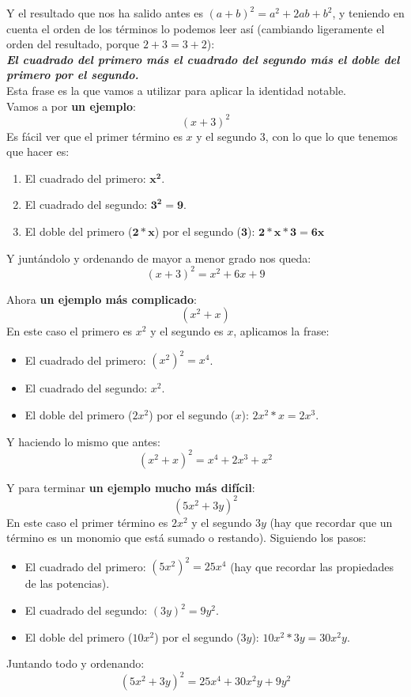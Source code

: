 \documentclass[a4paper,11pt,answers]{exam}
\begin{document}
  Y el resultado que nos ha salido antes es $(a+b)^2 = a^2 + 2ab + b^2$, y teniendo en cuenta el orden de los términos lo podemos leer así (cambiando ligeramente el orden del resultado, porque $2+3 = 3 +2$):\\
  \textbf{\emph{El cuadrado del primero más el cuadrado del segundo más el doble del primero por el segundo.}}\\
  Esta frase es la que vamos a utilizar para aplicar la identidad notable.\\

  Vamos a por \textbf{un ejemplo}:
  \[(x + 3)^2\]
  Es fácil ver que el primer término es $x$ y el segundo $3$, con lo que lo que tenemos que hacer es:
  \begin{enumerate}
  \item El cuadrado del primero: $\boldsymbol{x^2}$.
  \item El cuadrado del segundo: $\boldsymbol{3^2 = 9}$.
  \item El doble del primero ($\boldsymbol{2*x}$) por el segundo ($\boldsymbol{3}$): $\boldsymbol{2*x*3 = 6x}$
  \end{enumerate}
  Y juntándolo y ordenando de mayor a menor grado nos queda:
  \[(x+3)^2 = x^2 + 6x + 9\]

  Ahora \textbf{un ejemplo más complicado}:
  \[(x^2 + x)\]
  En este caso el primero es $x^2$ y el segundo es $x$, aplicamos la frase:
  \begin{itemize}
  \item El cuadrado del primero: $\left(x^2\right)^2 = x^4$.
  \item El cuadrado del segundo: $x^2$.
  \item El doble del primero ($2x^2$) por el segundo ($x$): $2x^2*x = 2x^3$.
  \end{itemize}
  Y haciendo lo mismo que antes:
  \[(x^2 + x)^2 = x^4 + 2x^3 + x^2\]

  Y para terminar \textbf{un ejemplo mucho más difícil}:
  \[(5x^2 + 3y)^2\]
  En este caso el primer término es $2x^2$ y el segundo $3y$ (hay que recordar que un término es un monomio que está sumado o restando). Siguiendo los pasos:
  \begin{itemize}
  \item El cuadrado del primero: $\left(5x^2\right)^2 = 25x^4$ (hay que recordar las propiedades de las potencias).
  \item El cuadrado del segundo: $(3y)^2 = 9y^2$.
  \item El doble del primero ($10x^2$) por el segundo ($3y$): $10x^2 * 3y = 30x^2 y$.
  \end{itemize}
  Juntando todo y ordenando:
  \[(5x^2 + 3y)^2 = 25x^4 + 30x^2 y + 9y^2\]
\end{document}
